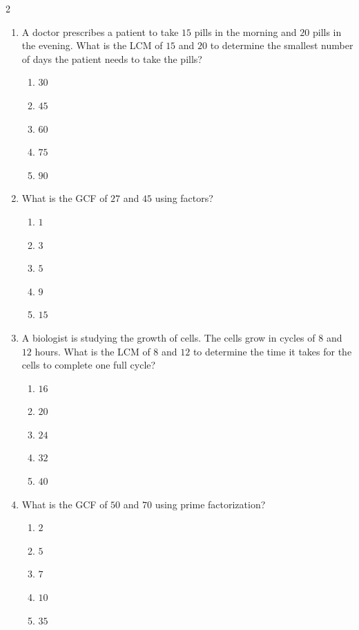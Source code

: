 \documentclass[10pt]{article}
\begin{document}
\begin{multicols}{2}
\begin{enumerate}[label=\textbf{Q\arabic*.}, leftmargin=*, itemsep=6pt, parsep=0pt]
  \item \small A doctor prescribes a patient to take $15$ pills in the morning and $20$ pills in the evening. What is the LCM of $15$ and $20$ to determine the smallest number of days the patient needs to take the pills?
  \begin{enumerate}[label=(\Alph*), leftmargin=0.6cm, nosep, itemsep=2pt]
    \item $30$
    \item $45$
    \item $60$
    \item $75$
    \item $90$
  \end{enumerate}

  \item \small What is the GCF of $27$ and $45$ using factors?
  \begin{enumerate}[label=(\Alph*), leftmargin=0.6cm, nosep, itemsep=2pt]
    \item $1$
    \item $3$
    \item $5$
    \item $9$
    \item $15$
  \end{enumerate}

  \item \small A biologist is studying the growth of cells. The cells grow in cycles of $8$ and $12$ hours. What is the LCM of $8$ and $12$ to determine the time it takes for the cells to complete one full cycle?
  \begin{enumerate}[label=(\Alph*), leftmargin=0.6cm, nosep, itemsep=2pt]
    \item $16$
    \item $20$
    \item $24$
    \item $32$
    \item $40$
  \end{enumerate}

  \item \small What is the GCF of $50$ and $70$ using prime factorization?
  \begin{enumerate}[label=(\Alph*), leftmargin=0.6cm, nosep, itemsep=2pt]
    \item $2$
    \item $5$
    \item $7$
    \item $10$
    \item $35$
  \end{enumerate}


\end{enumerate}
\end{multicols}
\end{document}

